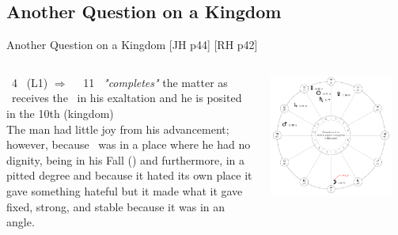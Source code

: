 \subsection{Another Question on a Kingdom}
\begin{frame}[t]{Another Question on a Kingdom [JH p44] [RH p42]}
\begin{columns}[T, onlytextwidth]
\Moon\ 4 \Libra\ (L1) $\Rightarrow$ \Opposition\ \Saturn\ 11 \Libra\ \textsl{"completes"} the matter as \Saturn\ receives the \Moon\ in his exaltation and he is posited in the 10th (kingdom) \\
\vspace{0.5cm}
The man had little joy from his advancement; however, because \Saturn\ was in a place where he had no dignity, being in his Fall (\Aries) and furthermore, in a pitted degree and because it hated its own place it gave something hateful but it made what it gave fixed, strong, and stable because it was in an angle.
 
\begin{center}
{\includegraphics[width=0.9\textwidth]{charts/51-chart-kingdom}} \\
\end{center}
\end{columns}
\end{frame}